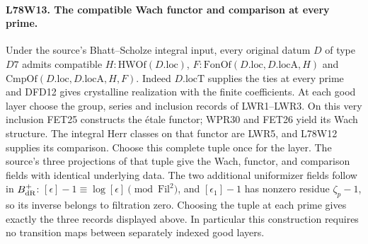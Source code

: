 \paragraph{L78W13. The compatible Wach functor and comparison at every prime.}
Under the source's Bhatt--Scholze integral input, every original
datum $D$ of type $D7$ admits compatible
$H:\mathrm{HWOf}(D.\mathrm{loc})$,
$F:\mathrm{FonOf}(D.\mathrm{loc},D.\mathrm{locA},H)$
and $\mathrm{CmpOf}(D.\mathrm{loc},D.\mathrm{locA},H,F)$.
Indeed $D.\mathrm{locT}$ supplies the ties at every prime and
DFD12 gives crystalline realization with the finite coefficients.
At each good layer choose the group, series and inclusion records
of LWR1--LWR3. On this very inclusion FET25 constructs the \'etale
functor; WPR30 and FET26 yield its Wach structure. The integral
Herr classes on that functor are LWR5, and L78W12 supplies its
comparison. Choose this complete tuple once for the layer. The
source's three projections of that tuple give the Wach, functor,
and comparison fields with identical underlying data. The two
additional uniformizer fields follow in $B_{\rm dR}^+$:
$[\epsilon]-1\equiv\log[\epsilon]\pmod{\mathrm{Fil}^2}$, and
$[\epsilon_1]-1$ has nonzero residue $\zeta_p-1$, so its inverse
belongs to filtration zero. Choosing the tuple at each prime
gives exactly the three records displayed above. In particular
this construction requires no transition maps between separately
indexed good layers.
